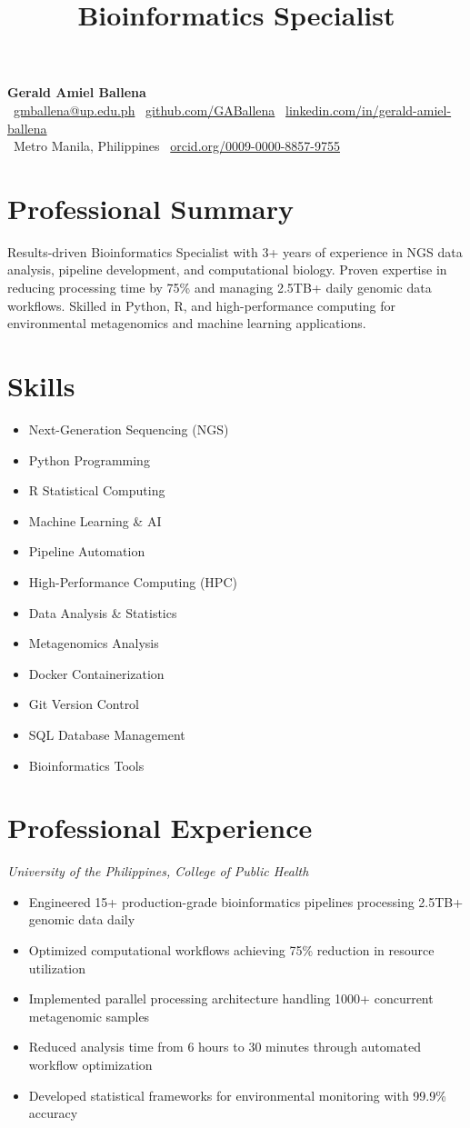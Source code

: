 \documentclass[11pt,a4paper,sans]{moderncv}
\title{Bioinformatics Specialist}
\makeatletter
\renewcommand{\makecvtitle}{
	\vspace*{-2em}
	\begin{center}
		{\Huge \textbf{Gerald Amiel Ballena}} \\[0.5em]
		\faEnvelope \ \href{mailto:gmballena@up.edu.ph}{gmballena@up.edu.ph} \quad
		\faGithub \ \href{https://github.com/GABallena}{github.com/GABallena} \quad
		\faLinkedin \ \href{https://linkedin.com/in/gerald-amiel-ballena}{linkedin.com/in/gerald-amiel-ballena} \\[0.5em]
		\faMapMarker \ Metro Manila, Philippines \quad
		\aiOrcid \ \href{https://orcid.org/0009-0000-8857-9755}{orcid.org/0009-0000-8857-9755}
	\end{center}
	\vspace{1.5em}
}
\makeatother
\begin{document}
	
	\makecvtitle
	
\section{Professional Summary}
Results-driven Bioinformatics Specialist with 3+ years of experience in NGS data analysis, pipeline development, and computational biology. Proven expertise in reducing processing time by 75\% and managing 2.5TB+ daily genomic data workflows. Skilled in Python, R, and high-performance computing for environmental metagenomics and machine learning applications.

\section{Skills}
\begin{multicols}{2}
\begin{itemize}
    \item Next-Generation Sequencing (NGS)
    \item Python Programming
    \item R Statistical Computing
    \item Machine Learning \& AI
    \item Pipeline Automation
    \item High-Performance Computing (HPC)
    \item Data Analysis \& Statistics
    \item Metagenomics Analysis
    \item Docker Containerization
    \item Git Version Control
    \item SQL Database Management
    \item Bioinformatics Tools
\end{itemize}
\end{multicols}

\section{Professional Experience}
\textit{University of the Philippines, College of Public Health}
\begin{itemize}
    \item Engineered 15+ production-grade bioinformatics pipelines processing 2.5TB+ genomic data daily
    \item Optimized computational workflows achieving 75\% reduction in resource utilization
    \item Implemented parallel processing architecture handling 1000+ concurrent metagenomic samples
    \item Reduced analysis time from 6 hours to 30 minutes through automated workflow optimization
    \item Developed statistical frameworks for environmental monitoring with 99.9\% accuracy
\end{itemize}
\end{document}
